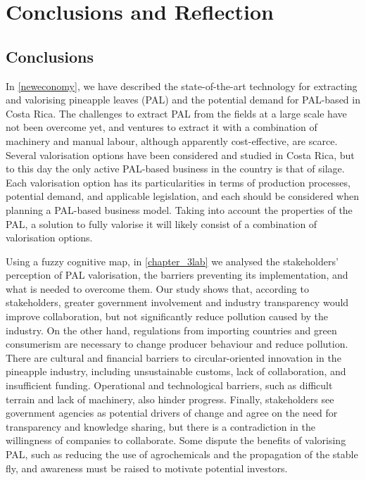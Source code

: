 \chapter{Conclusions and Reflection}
\label{concludeGen}

\section{Conclusions}

In \cref{neweconomy}, we have described the state-of-the-art technology for extracting and valorising pineapple leaves (PAL) and the potential demand for PAL-based in Costa Rica. The challenges to extract PAL from the fields at a large scale have not been overcome yet, and ventures to extract it with a combination of machinery and manual labour, although apparently cost-effective, are scarce. Several valorisation options have been considered and studied in Costa Rica, but to this day the only active PAL-based business in the country is that of silage. Each valorisation option has its particularities in terms of production processes, potential demand, and applicable legislation, and each should be considered when planning a PAL-based business model. Taking into account the properties of the PAL, a solution to fully valorise it will likely consist of a combination of valorisation options. 

Using a fuzzy cognitive map, in \cref{chapter_3lab} we analysed the stakeholders' perception of PAL valorisation, the barriers preventing its implementation, and what is needed to overcome them. Our study shows that, according to stakeholders, greater government involvement and industry transparency would improve collaboration, but not significantly reduce pollution caused by the industry. On the other hand, regulations from importing countries and green consumerism are necessary to change producer behaviour and reduce pollution. There are cultural and financial barriers to circular-oriented innovation in the pineapple industry, including unsustainable customs, lack of collaboration, and insufficient funding. Operational and technological barriers, such as difficult terrain and lack of machinery, also hinder progress. Finally, stakeholders see government agencies as potential drivers of change and agree on the need for transparency and knowledge sharing, but there is a contradiction in the willingness of companies to collaborate. Some dispute the benefits of valorising PAL, such as reducing the use of agrochemicals and the propagation of the stable fly, and awareness must be raised to motivate potential investors.


